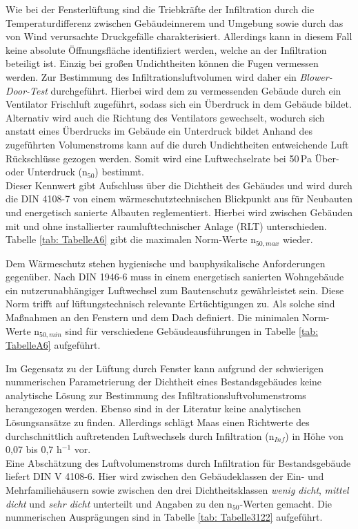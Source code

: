Wie bei der Fensterlüftung sind die Triebkräfte der Infiltration durch die Temperaturdifferenz zwischen Gebäudeinnerem und Umgebung sowie durch das von Wind verursachte Druckgefälle charakterisiert.
Allerdings kann in diesem Fall keine absolute Öffnungsfläche identifiziert werden, welche an der Infiltration beteiligt ist.
Einzig bei großen Undichtheiten können die Fugen vermessen werden.
Zur Bestimmung des Infiltrationsluftvolumen wird daher ein \textit{Blower-Door-Test} durchgeführt.
Hierbei wird dem zu vermessenden Gebäude durch ein Ventilator Frischluft zugeführt, sodass sich ein Überdruck in dem Gebäude bildet.
Alternativ wird auch die Richtung des Ventilators gewechselt, wodurch sich anstatt eines Überdrucks im Gebäude ein Unterdruck bildet
Anhand des zugeführten Volumenstroms kann auf die durch Undichtheiten entweichende Luft Rückschlüsse gezogen werden. 
Somit wird eine Luftwechselrate bei 50\,Pa Über- oder Unterdruck (n\(_{50}\)) bestimmt. \cite{Schild.2013} \\
Dieser Kennwert gibt Aufschluss über die Dichtheit des Gebäudes und wird durch die DIN 4108-7 \cite{DINDeutschesInstitutfurNormunge.V..September2017} von einem wärmeschutztechnischen Blickpunkt aus für Neubauten und energetisch sanierte Albauten reglementiert. 
Hierbei wird zwischen Gebäuden mit und ohne installierter raumlufttechnischer Anlage (RLT) unterschieden.
Tabelle \ref{tab: TabelleA6} gibt die maximalen Norm-Werte n\(_{50, max}\) wieder.

Dem Wärmeschutz stehen hygienische und bauphysikalische Anforderungen gegenüber.
Nach DIN 1946-6 muss in einem energetisch sanierten Wohngebäude ein nutzerunabhängiger Luftwechsel zum Bautenschutz gewährleistet sein.
Diese Norm trifft auf lüftungstechnisch relevante Ertüchtigungen zu.
Als solche sind Maßnahmen an den Fenstern und dem Dach definiert.
Die minimalen Norm-Werte n\(_{50, min}\) sind für verschiedene Gebäudeausführungen in Tabelle \ref{tab: TabelleA6} aufgeführt.

Im Gegensatz zu der Lüftung durch Fenster kann aufgrund der schwierigen nummerischen Parametrierung der Dichtheit eines Bestandsgebäudes keine analytische Lösung zur Bestimmung des Infiltrationsluftvolumenstroms herangezogen werden.
Ebenso sind in der Literatur keine analytischen Lösungsansätze zu finden. 
Allerdings schlägt Maas \cite{Maas.2017} einen Richtwerte des durchschnittlich auftretenden Luftwechsels durch Infiltration (n\(_{Inf}\)) in Höhe von 0,07 bis 0,7 h\(^{-1}\) vor.\\
Eine Abschätzung des Luftvolumenstroms durch Infiltration für Bestandsgebäude liefert DIN V 4108-6.
Hier wird zwischen den Gebäudeklassen der Ein- und Mehrfamiliehäusern sowie zwischen den drei Dichtheitsklassen \textit{wenig dicht}, \textit{mittel dicht} und \textit{sehr dicht} unterteilt und Angaben zu den n\(_{50}\)-Werten gemacht. 
Die nummerischen Ausprägungen sind in Tabelle \ref{tab: Tabelle3122} aufgeführt.

